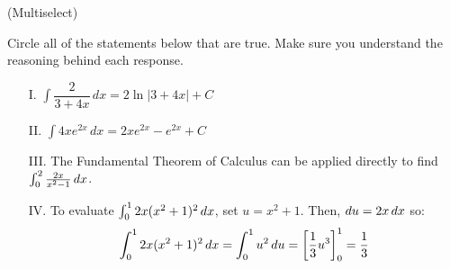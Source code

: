 \documentclass[handout,hints]{ximera}
\begin{document}
\begin{problem}
(Multiselect)

Circle all of the statements below that are true.  Make sure you understand the reasoning behind each response.

\begin{itemize}
\item[I.] $\displaystyle \int \dfrac{2}{3+4x} \, dx = 2\ln|3+4x|+C$

\item[II.] $\displaystyle \int 4xe^{2x} \, dx = 2xe^{2x}-e^{2x}+C$

\item[III.] The Fundamental Theorem of Calculus can be applied directly to find $ \int_0^2 \frac{2x}{x^2-1} \mathop{}\!d x$.

\item[IV.] To evaluate $ \int_0^1 2x(x^2+1)^2 \mathop{}\!d x$, set $u=x^2+1$.  Then, $\mathop{}\!d u = 2x \mathop{}\!d x$ so:
\[ \int_0^1 2x(x^2+1)^2 \mathop{}\!d x = \int_0^1 u^2 \mathop{}\!d u = \bigg[ \frac{1}{3} u^3 \bigg]_0^1 = \frac{1}{3}\]
\end{itemize}

\end{problem}
\end{document}

